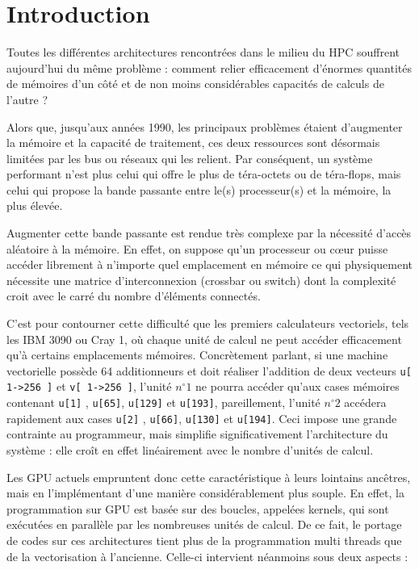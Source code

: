 \documentclass[a4paper,12pt]{article}
\begin{document}
\clearpage


%
%

\section{Introduction}
Toutes les différentes architectures rencontrées dans le milieu du HPC souffrent aujourd'hui du même problème : comment relier efficacement d'énormes quantités de mémoires d'un côté et de non moins considérables capacités de calculs de l'autre ?

Alors que, jusqu'aux années 1990, les principaux problèmes étaient d'augmenter la mémoire et la capacité de traitement, ces deux ressources sont désormais limitées par les bus ou réseaux qui les relient. Par conséquent, un système performant n'est plus celui qui offre le plus de téra-octets ou de téra-flops, mais celui qui propose la bande passante entre le(s) processeur(s) et la mémoire, la plus élevée.

Augmenter cette bande passante est rendue très complexe par la nécessité d'accès aléatoire à la mémoire. En effet, on suppose qu'un processeur ou c\oe ur puisse accéder librement à n'importe quel emplacement en mémoire ce qui physiquement nécessite une matrice d'interconnexion (crossbar ou switch) dont la complexité croit avec le carré du nombre d'éléments connectés.

C'est pour contourner cette difficulté que les premiers calculateurs vectoriels, tels les IBM 3090 ou Cray 1, où chaque unité de calcul ne peut accéder efficacement qu'à certains emplacements mémoires. Concrètement parlant, si une machine vectorielle possède 64 additionneurs et doit réaliser l'addition de deux vecteurs {\tt u[ 1->256 ]} et {\tt v[ 1->256 ]}, l'unité $n^\circ1$ ne pourra accéder qu'aux cases mémoires contenant {\tt u[1]} , {\tt u[65]}, {\tt u[129]} et  {\tt u[193]}, pareillement, l'unité  $n^\circ2$ accédera rapidement aux cases {\tt u[2]} , {\tt u[66]}, {\tt u[130]} et  {\tt u[194]}. Ceci impose une grande contrainte au programmeur, mais simplifie significativement l'architecture du système : elle croît en effet linéairement avec le nombre d'unités de calcul.

Les GPU actuels empruntent donc cette caractéristique à leurs lointains ancêtres, mais en l'implémentant d'une manière considérablement plus souple. En effet, la programmation sur GPU est basée sur des boucles, appelées kernels, qui sont exécutées en parallèle par les nombreuses unités de calcul. De ce fait, le portage de codes sur ces architectures tient plus de la programmation multi threads que de la vectorisation à l'ancienne. Celle-ci intervient néanmoins sous deux aspects :
\end{document}
